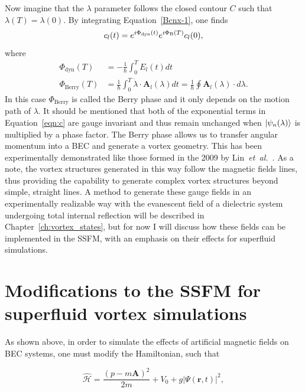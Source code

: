 Now imagine that the $\lambda$ parameter follows the closed contour $C$ such that $\lambda(T) = \lambda(0)$. 
By integrating Equation~\eqref{Bcnx-1}, one finds
\begin{equation}
c_l(t) = e^{i \Phi_{\text{dyn}}(t)}e^{i\Phi_{\text B}(T)}c_l(0),
\label{eqn:c}
\end{equation}
where
\begin{equation}
\begin{split}
\Phi_{\text{dyn}}(T) &= - \frac{1}{\hbar}\int_0^TE_l(t)dt \\
\Phi_{\text{Berry}} (T)&= \frac{1}{\hbar} \int_0 ^T \dot{\lambda} \cdot \mathbf{A}_l(\lambda)dt = \frac{1}{\hbar}\oint\mathbf{A}_l(\lambda) \cdot d\lambda.
\end{split}
\end{equation}
In this case $\Phi_{\text{Berry}}$ is called the Berry phase and it only depends on the motion path of $\lambda$. 
It should be mentioned that both of the exponential terms in Equation~\eqref{eqn:c} are gauge invariant and thus remain unchanged when $\ket{\psi_n(\lambda)}$ is multiplied by a phase factor.
The Berry phase allows us to transfer angular momentum into a BEC and generate a vortex geometry.
This has been experimentally demonstrated like those formed in the 2009 by Lin~\textit{et~al.}~\cite{lin2009}.
As a note, the vortex structures generated in this way follow the magnetic fields lines, thus providing the capability to generate complex vortex structures beyond simple, straight lines.
A method to generate these gauge fields in an experimentally realizable way with the evanescent field of a dielectric system undergoing total internal reflection will be described in Chapter~\ref{ch:vortex_states}, but for now I will discuss how these fields can be implemented in the SSFM, with an emphasis on their effects for superfluid simulations.

\section{Modifications to the SSFM for superfluid vortex simulations}
\label{sec:implementation}

As shown above, in order to simulate the effects of artificial magnetic fields on BEC systems, one must modify the Hamiltonian, such that

\begin{equation}
\mathcal{\hat H} = \frac{(p-m\mathbf{A})^2}{2m} + V_0 + g|\Psi(\mathbf{r},t)|^2,
\end{equation}

